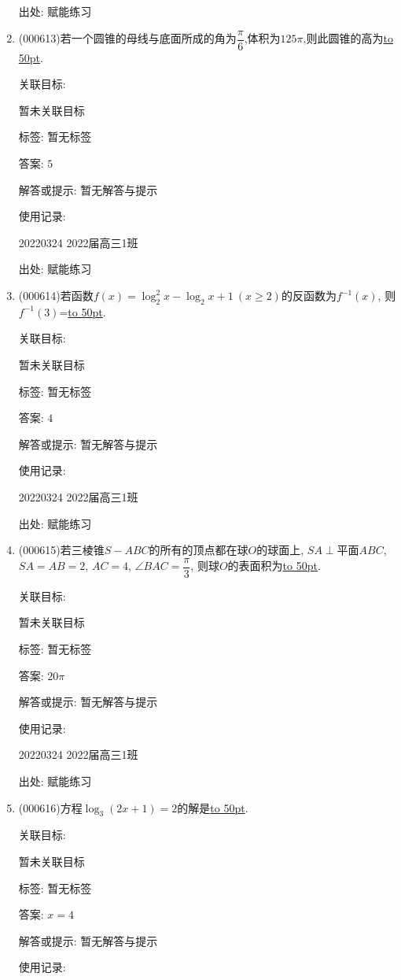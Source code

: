 \documentclass[10pt,a4paper]{article}
\newcommand{\blank}[1]{\underline{\hbox to #1pt{}}}
\begin{document}
\begin{enumerate}[1.]
出处: 赋能练习
\item { (000613)}若一个圆锥的母线与底面所成的角为$\dfrac{\pi}6$,体积为$125\pi$,则此圆锥的高为\blank{50}.


关联目标:

暂未关联目标



标签: 暂无标签

答案: $5$

解答或提示: 暂无解答与提示

使用记录:

20220324	2022届高三1班	


出处: 赋能练习
\item { (000614)}若函数$f(x)=\log_2^2x-\log_2 x+1 \ (x\ge 2)$的反函数为$f^{-1}(x)$, 则$f^{-1}(3)$=\blank{50}.


关联目标:

暂未关联目标



标签: 暂无标签

答案: $4$

解答或提示: 暂无解答与提示

使用记录:

20220324	2022届高三1班	


出处: 赋能练习
\item { (000615)}若三棱锥$S-ABC$的所有的顶点都在球$O$的球面上, $SA\perp$平面$ABC$, $SA=AB=2$, $AC=4$, $\angle BAC=\dfrac{\pi}3$, 则球$O$的表面积为\blank{50}.


关联目标:

暂未关联目标



标签: 暂无标签

答案: $20\pi$

解答或提示: 暂无解答与提示

使用记录:

20220324	2022届高三1班	


出处: 赋能练习
\item { (000616)}方程$\log_3(2x+1)=2$的解是\blank{50}.


关联目标:

暂未关联目标



标签: 暂无标签

答案: $x=4$

解答或提示: 暂无解答与提示

使用记录:


\end{enumerate}
\end{document}
